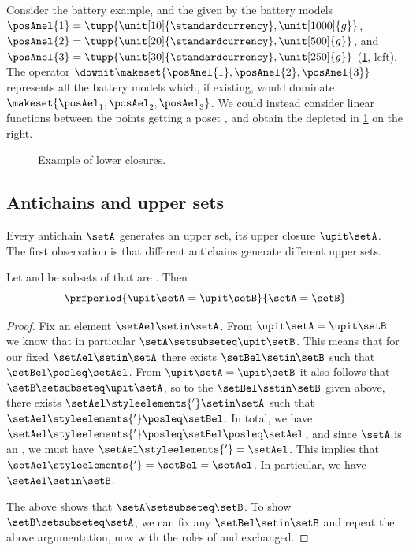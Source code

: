 Consider the battery example, and the  given by the battery models $\posAnel{1}=\tupp{\unit[10]{\standardcurrency},\unit[1000]{g}}$, $\posAnel{2}=\tupp{\unit[20]{\standardcurrency},\unit[500]{g}}$, and $\posAnel{3}=\tupp{\unit[30]{\standardcurrency},\unit[250]{g}}$ (\cref{fig:examplebatt}, left).
The  operator $\downit\makeset{\posAnel{1},\posAnel{2},\posAnel{3}}$ represents all the battery models which, if existing, would dominate $\makeset{\posAel_1,\posAel_2,\posAel_3}$.
We could instead consider linear functions between the points getting a poset \posA, and obtain the  depicted in \cref{fig:examplebatt} on the right.

\begin{figure}[h!]
    \centering
    \hfill
    \hfill
    \caption{Example of lower closures.}
    \label{fig:examplebatt}
\end{figure}

\subsection{Antichains and upper sets}

Every antichain $\setA$ generates an upper set, its upper closure $\upit \setA$.
The first observation is that different antichains generate different upper sets.

\begin{lemma}
    \label{lem:up-cl-inj-antichains}
    Let \setA and \setB be subsets of \posA that are .
    Then
    \begin{equation}
        \prfperiod{
            \upit \setA = \upit \setB
        }{
            \setA = \setB
        }
    \end{equation}
\end{lemma}

\begin{proof}
    Fix an element $\setAel \setin \setA$.
    From $\upit \setA = \upit \setB$ we know that in particular $\setA \setsubseteq \upit \setB$.
    This means that for our fixed $\setAel \setin \setA$ there exists $\setBel \setin \setB$ such that $\setBel \posleq \setAel$.
    From $\upit \setA = \upit \setB$ it also follows that $\setB \setsubseteq \upit \setA$, so to the $\setBel \setin \setB$ given above, there exists $\setAel\styleelements{'} \setin \setA$ such that $\setAel\styleelements{'} \posleq \setBel$.
    In total, we have $\setAel\styleelements{'} \posleq \setBel \posleq \setAel$, and since $\setA$ is an , we must have $\setAel\styleelements{'} = \setAel$.
    This implies that $\setAel\styleelements{'} = \setBel = \setAel$.
    In particular, we have $\setAel \setin \setB$.

    The above shows that $\setA \setsubseteq \setB$.
    To show $\setB \setsubseteq \setA$, we can fix any $\setBel \setin \setB$ and repeat the above argumentation, now with the roles of \setA and \setB exchanged.
\end{proof}

